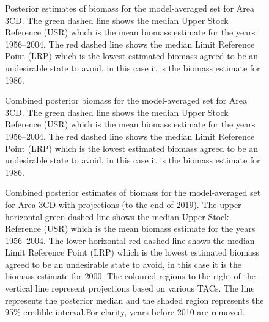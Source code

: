 \documentclass[11pt]{book}
\begin{document}
\begin{figure}[htb]

{\centering {} 

}

\caption{Posterior estimates of biomass for the model-averaged set for Area 3CD. The green dashed line shows the median Upper Stock Reference (USR) which is the mean biomass estimate for the years 1956--2004. The red dashed line shows the median Limit Reference Point (LRP) which is the lowest estimated biomass agreed to be an undesirable state to avoid, in this case it is the biomass estimate for 1986.}\label{fig:summary-fig-model-average-biomass-comp-3cd}
\end{figure}
\clearpage
\begin{figure}[htb]

{\centering {} 

}

\caption{Combined posterior biomass for the model-averaged set for Area 3CD.  The green dashed line shows the median Upper Stock Reference (USR) which is the mean biomass estimate for the years 1956--2004. The red dashed line shows the median Limit Reference Point (LRP) which is the lowest estimated biomass agreed to be an undesirable state to avoid, in this case it is the biomass estimate for 1986.}\label{fig:summary-fig-model-average-biomass-3cd}
\end{figure}
\clearpage
\begin{figure}[htb]

{\centering {} 

}

\caption{Combined posterior estimates of biomass for the model-averaged set for Area 3CD with projections (to the end of 2019).  The upper horizontal green dashed line shows the median Upper Stock Reference (USR) which is the mean biomass estimate for the years 1956--2004. The lower horizontal red dashed line shows the median Limit Reference Point (LRP) which is the lowest estimated biomass agreed to be an undesirable state to avoid, in this case it is the biomass estimate for 2000. The coloured regions to the right of the vertical line represent projections based on various TACs. The line represents the posterior median and the shaded region represents the 95\% credible interval.For clarity, years before 2010 are removed.}\label{fig:summary-fig-model-average-biomass-3cd-proj}
\end{figure}
\clearpage
\end{document}
